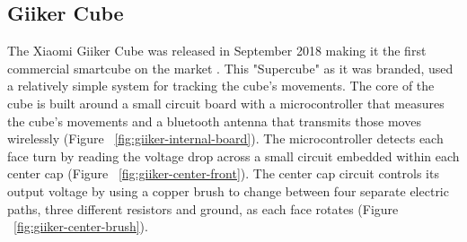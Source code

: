 \subsection{Giiker Cube}
The Xiaomi Giiker Cube was released in September 2018 making it the first commercial smartcube on the market \cite{giiker-thecubicle}.
This "Supercube" as it was branded, used a relatively simple system for tracking the cube's movements.
The core of the cube is built around a small circuit board with a microcontroller that measures the cube's movements and a bluetooth antenna that transmits those moves wirelessly (Figure ~\ref{fig:giiker-internal-board}).
The microcontroller detects each face turn by reading the voltage drop across a small circuit embedded within each center cap (Figure ~\ref{fig:giiker-center-front}).
The center cap circuit controls its output voltage by using a copper brush to change between four separate electric paths, three different resistors and ground, as each face rotates (Figure ~\ref{fig:giiker-center-brush}). \cite{giiker-internals}



